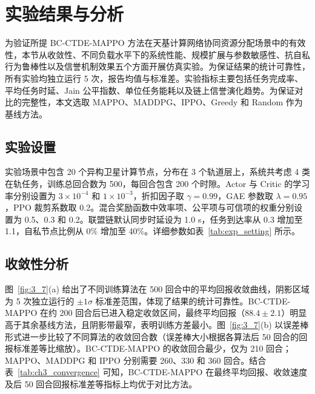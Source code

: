
\section{实验结果与分析}
\label{sec:ch3_experiment}

为验证所提 BC-CTDE-MAPPO 方法在天基计算网络协同资源分配场景中的有效性，本节从收敛性、不同负载水平下的系统性能、规模扩展与参数敏感性、抗自私行为鲁棒性以及信誉机制效果五个方面开展仿真实验。为保证结果的统计可靠性，所有实验均独立运行 5 次，报告均值与标准差。实验指标主要包括任务完成率、平均任务时延、Jain 公平指数、单位任务能耗以及链上信誉演化趋势。为保证对比的完整性，本文选取 MAPPO、MADDPG、IPPO、Greedy 和 Random 作为基线方法。

\subsection{实验设置}
实验场景中包含 20 个异构卫星计算节点，分布在 3 个轨道层上，系统共考虑 4 类在轨任务，训练总回合数为 500，每回合包含 200 个时隙。Actor 与 Critic 的学习率分别设置为 $3\times10^{-4}$ 和 $1\times10^{-3}$，折扣因子取 $\gamma=0.99$，GAE 参数取 $\lambda=0.95$，PPO 裁剪系数取 0.2。混合奖励函数中效率项、公平项与可信项的权重分别设置为 0.5、0.3 和 0.2。联盟链默认同步时延设为 1.0 s，任务到达率从 0.3 增加至 1.1，自私节点比例从 0\% 增加至 40\%。详细参数如表~\ref{tab:exp_setting} 所示。

\subsection{收敛性分析}
图~\ref{fig:3_7}(a) 给出了不同训练算法在 500 回合中的平均回报收敛曲线，阴影区域为 5 次独立运行的 $\pm1\sigma$ 标准差范围，体现了结果的统计可靠性。BC-CTDE-MAPPO 在约 200 回合后已进入稳定收敛区间，最终平均回报（$88.4\pm2.1$）明显高于其余基线方法，且阴影带最窄，表明训练方差最小。图~\ref{fig:3_7}(b) 以误差棒形式进一步比较了不同算法的收敛回合数（误差棒大小根据各算法后 50 回合的回报标准差等比缩放）。BC-CTDE-MAPPO 的收敛回合最少，仅为 210 回合；MAPPO、MADDPG 和 IPPO 分别需要 260、330 和 360 回合。结合表~\ref{tab:ch3_convergence} 可知，BC-CTDE-MAPPO 在最终平均回报、收敛速度及后 50 回合回报标准差等指标上均优于对比方法。

